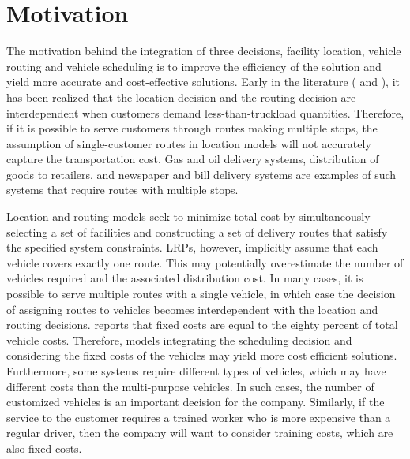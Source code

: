 \section {Motivation}
The motivation behind the integration of three decisions, facility location, 
vehicle routing and vehicle scheduling is to improve the efficiency of the 
solution and yield more accurate and cost-effective solutions. 
Early in the literature (\citet{Webb} and \citet{Salhi}),
it has been realized that the location decision and the routing 
decision are interdependent when customers demand less-than-truckload quantities.
Therefore, if it is possible to serve customers through routes making multiple stops, 
the assumption of single-customer routes in location models will not accurately 
capture the transportation cost. Gas and oil delivery systems, distribution of goods to 
retailers, and newspaper and bill delivery systems are examples of such systems
that require routes with multiple stops.

Location and routing models seek to minimize total cost by simultaneously selecting a 
set of facilities and constructing a set of delivery routes that satisfy the specified 
system constraints. LRPs, however, implicitly assume that each
vehicle covers exactly one route. This may potentially overestimate the number of 
vehicles required and the associated distribution cost. In many cases, it is 
possible to serve multiple routes with a single vehicle, in which case the 
decision of assigning routes to vehicles becomes interdependent with
the location and routing decisions. \citet{Eilon} reports that fixed costs 
are equal to the eighty percent of total vehicle costs. Therefore, models 
integrating the scheduling decision and considering the fixed costs of the 
vehicles may yield more cost efficient solutions. Furthermore, some systems 
require different types of vehicles, which may have different costs 
than the multi-purpose vehicles. In such cases, the number of 
customized vehicles is an important decision for the 
company. Similarly, if the service to the customer 
requires a trained worker who is more expensive than a regular driver, then
the company will want to consider training costs, which are also fixed costs.


